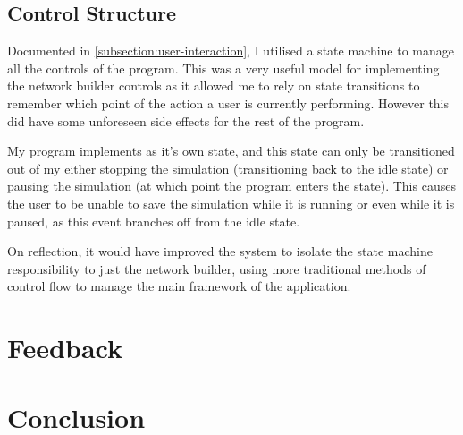     \subsection{Control Structure}

        Documented in \autoref{subsection:user-interaction}, I utilised a state machine to manage all the controls of the program. This was a very useful model for implementing the network builder controls as it allowed me to rely on state transitions to remember which point of the action a user is currently performing. However this did have some unforeseen side effects for the rest of the program.

        My program implements  as it's own state, and this state can only be transitioned out of my either stopping the simulation (transitioning back to the idle state) or pausing the simulation (at which point the program enters the  state). This causes the user to be unable to save the simulation while it is running or even while it is paused, as this event branches off from the idle state.

        On reflection, it would have improved the system to isolate the state machine responsibility to just the network builder, using more traditional methods of control flow to manage the main framework of the application.

\section{Feedback}

\section{Conclusion}
